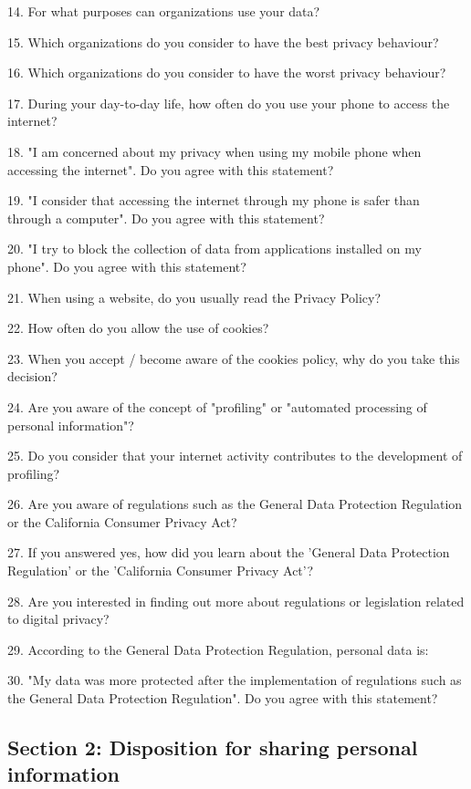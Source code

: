 14. For what purposes can organizations use your data?


15. Which organizations do you consider to have the best privacy behaviour?


16. Which organizations do you consider to have the worst privacy behaviour?


17. During your day-to-day life, how often do you use your phone to access the internet?


18. "I am concerned about my privacy when using my mobile phone when accessing the internet". Do you agree with this statement?


19. "I consider that accessing the internet through my phone is safer than through a computer". Do you agree with this statement?


20. "I try to block the collection of data from applications installed on my phone". Do you agree with this statement?


21. When using a website, do you usually read the Privacy Policy?


22. How often do you allow the use of cookies?


23. When you accept / become aware of the cookies policy, why do you take this decision?


24. Are you aware of the concept of "profiling" or "automated processing of personal information"?


25. Do you consider that your internet activity contributes to the development of profiling?


26. Are you aware of regulations such as the General Data Protection Regulation or the California Consumer Privacy Act?


27. If you answered yes, how did you learn about the 'General Data Protection Regulation' or the 'California Consumer Privacy Act'?


28. Are you interested in finding out more about regulations or legislation related to digital privacy?


29. According to the General Data Protection Regulation, personal data is:


30. "My data was more protected after the implementation of regulations such as the General Data Protection Regulation". Do you agree with this statement?

\subsection*{Section 2: Disposition for sharing personal information}

